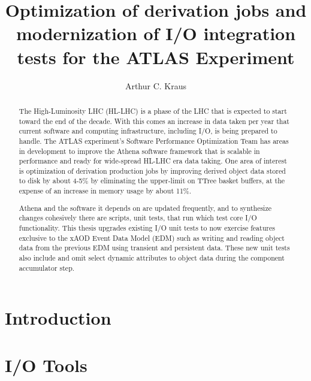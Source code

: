 \documentclass[12pt]{niuthesis}
\title{Optimization of derivation jobs and modernization of I/O integration tests for the ATLAS Experiment}
\author{Arthur C. Kraus}
\begin{document}
\begin{abstract}
The High-Luminosity LHC (HL-LHC) is a phase of the LHC that is expected to start toward the end of the decade. 
With this comes an increase in data taken per year that current software and computing infrastructure, including I/O, is being prepared to handle. 
The ATLAS experiment's Software Performance Optimization Team has areas in development to improve the Athena software framework that is scalable in performance and ready for wide-spread HL-LHC era data taking. 
One area of interest is optimization of derivation production jobs by improving derived object data stored to disk by about 4-5\% by eliminating the upper-limit on TTree basket buffers, at the expense of an increase in memory usage by about 11\%. 

Athena and the software it depends on are updated frequently, and to synthesize changes cohesively there are scripts, unit tests, that run which test core I/O functionality. 
This thesis upgrades existing I/O unit tests to now exercise features exclusive to the xAOD Event Data Model (EDM) such as writing and reading object data from the previous EDM using transient and persistent data. 
These new unit tests also include and omit select dynamic attributes to object data during the component accumulator step. 
\end{abstract}

\begin{dedication}

\end{dedication}

\begin{acknowledgements}

\end{acknowledgements}
\MakeThesisPrologue




\chapter{Introduction}
\label{chap:Intro}


\chapter{I/O Tools}
\label{chap:IO_Tools}

\end{document}
